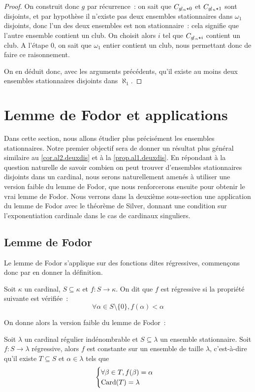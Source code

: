 \begin{proof}
  On construit donc $g$ par récurrence~: on sait que $C_{g\!\upharpoonright_{n}\star 0}$ et
  $C_{g\!\upharpoonright_{n}\star 1}$ sont disjoints, et par hypothèse il n'existe
  pas deux ensembles stationnaires dans $\omega_1$ disjoints, donc l'un des
  deux ensembles est non stationnaire~: cela signifie que l'autre ensemble
  contient un club. On choisit alors $i$ tel que $C_{g\!\upharpoonright_{n} \star i}$
  contient un club. A l'étape $0$, on sait que $\omega_1$ entier contient un
  club, nous permettant donc de faire ce raisonnement.

  On en déduit donc, avec les arguments précédents, qu'il existe au moins deux
  ensembles stationnaires disjoints dans $\aleph_1$.
\end{proof}

\section{Lemme de Fodor et applications}

Dans cette section, nous allons étudier plus précisément les ensembles
stationnaires. Notre premier objectif sera de donner un résultat plus général
similaire au \cref{cor.al2.deuxdis} et à la \cref{prop.al1.deuxdis}. En
répondant à la question naturelle de savoir combien on peut trouver d'ensembles
stationnaires disjoints dans un cardinal, nous serons naturellement amenés à
utiliser une version faible du lemme de Fodor, que nous renforcerons ensuite
pour obtenir le vrai lemme de Fodor. Nous verrons dans la deuxième sous-section
une application du lemme de Fodor avec le théorème de Silver, donnant une
condition sur l'exponentiation cardinale dans le cas de cardinaux singuliers.

\subsection{Lemme de Fodor}

Le lemme de Fodor s'applique sur des fonctions dites régressives, commençons
donc par en donner la définition.

\begin{definition}
  Soit $\kappa$ un cardinal, $S\subseteq \kappa$ et $f : S \to \kappa$. On
  dit que $f$ est régressive si la propriété suivante est vérifiée~:
  \[\forall \alpha \in S\setminus\{0\}, f(\alpha) < \alpha\]
\end{definition}

On donne alors la version faible du lemme de Fodor~:

\begin{lemma}\label{lem.fodor.faible}
  Soit $\lambda$ un cardinal régulier indénombrable et $S\subseteq \lambda$ un
  ensemble stationnaire. Soit $f : S \to \lambda$ régressive, alors $f$ est
  constante sur un ensemble de taille $\lambda$, c'est-à-dire qu'il existe
  $T\subseteq S$ et $\alpha \in \lambda$ tels que
  \[\begin{cases}
  \forall \beta \in T, f(\beta) = \alpha\\
  \operatorname{Card}(T) = \lambda
  \end{cases}\]
\end{lemma}

